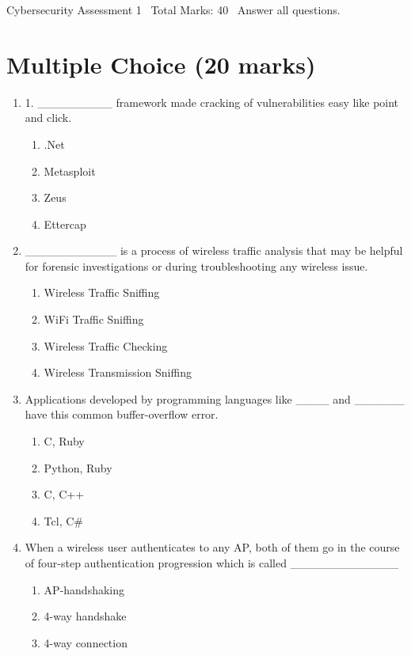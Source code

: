 \documentclass[12pt]{article}
\begin{document}
\begin{center}
Cybersecurity Assessment 1 \
Total Marks: 40 \
Answer all questions.
\end{center}

\section*{Multiple Choice (20 marks)}
\begin{enumerate}[label=\arabic*.]
\item 1. \_\_\_\_\_\_\_\_\_ framework made cracking of vulnerabilities easy like point and click.
\begin{enumerate}[label=(\alph*)]
    \item .Net
    \item Metasploit
    \item Zeus
    \item Ettercap
\end{enumerate}
\item \_\_\_\_\_\_\_\_\_\_\_ is a process of wireless traffic analysis that may be helpful for forensic investigations or during troubleshooting any wireless issue.
\begin{enumerate}[label=(\alph*)]
    \item Wireless Traffic Sniffing
    \item WiFi Traffic Sniffing
    \item Wireless Traffic Checking
    \item Wireless Transmission Sniffing
\end{enumerate}
\item Applications developed by programming languages like \_\_\_\_ and \_\_\_\_\_\_ have this common buffer-overflow error.
\begin{enumerate}[label=(\alph*)]
    \item C, Ruby
    \item Python, Ruby
    \item C, C++
    \item Tcl, C\#
\end{enumerate}
\item When a wireless user authenticates to any AP, both of them go in the course of four-step authentication progression which is called \_\_\_\_\_\_\_\_\_\_\_\_\_
\begin{enumerate}[label=(\alph*)]
    \item AP-handshaking
    \item 4-way handshake
    \item 4-way connection

\end{enumerate}
\end{enumerate}
\end{document}
